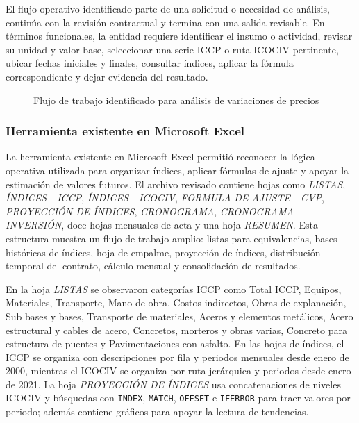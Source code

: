 \documentclass[12pt,letterpaper]{article}
\newcommand{\ICOCIV}{ICOCIV}
\newcommand{\ICCP}{ICCP}
\begin{document}
El flujo operativo identificado parte de una solicitud o necesidad de análisis, continúa con la revisión contractual y termina con una salida revisable. En términos funcionales, la entidad requiere identificar el insumo o actividad, revisar su unidad y valor base, seleccionar una serie \ICCP{} o ruta \ICOCIV{} pertinente, ubicar fechas iniciales y finales, consultar índices, aplicar la fórmula correspondiente y dejar evidencia del resultado.

\begin{figure}[H]
\centering
{}
\caption{Flujo de trabajo identificado para análisis de variaciones de precios}
\label{fig:flujo_trabajo_entidad}
\end{figure}

\subsubsection{Herramienta existente en Microsoft Excel}

La herramienta existente en Microsoft Excel permitió reconocer la lógica operativa utilizada para organizar índices, aplicar fórmulas de ajuste y apoyar la estimación de valores futuros. El archivo revisado contiene hojas como \textit{LISTAS}, \textit{ÍNDICES - ICCP}, \textit{ÍNDICES - ICOCIV}, \textit{FORMULA DE AJUSTE - CVP}, \textit{PROYECCIÓN DE ÍNDICES}, \textit{CRONOGRAMA}, \textit{CRONOGRAMA INVERSIÓN}, doce hojas mensuales de acta y una hoja \textit{RESUMEN}. Esta estructura muestra un flujo de trabajo amplio: listas para equivalencias, bases históricas de índices, hoja de empalme, proyección de índices, distribución temporal del contrato, cálculo mensual y consolidación de resultados.

En la hoja \textit{LISTAS} se observaron categorías \ICCP{} como Total \ICCP, Equipos, Materiales, Transporte, Mano de obra, Costos indirectos, Obras de explanación, Sub bases y bases, Transporte de materiales, Aceros y elementos metálicos, Acero estructural y cables de acero, Concretos, morteros y obras varias, Concreto para estructura de puentes y Pavimentaciones con asfalto. En las hojas de índices, el \ICCP{} se organiza con descripciones por fila y periodos mensuales desde enero de 2000, mientras el \ICOCIV{} se organiza por ruta jerárquica y periodos desde enero de 2021. La hoja \textit{PROYECCIÓN DE ÍNDICES} usa concatenaciones de niveles \ICOCIV{} y búsquedas con \texttt{INDEX}, \texttt{MATCH}, \texttt{OFFSET} e \texttt{IFERROR} para traer valores por periodo; además contiene gráficos para apoyar la lectura de tendencias.
\end{document}
